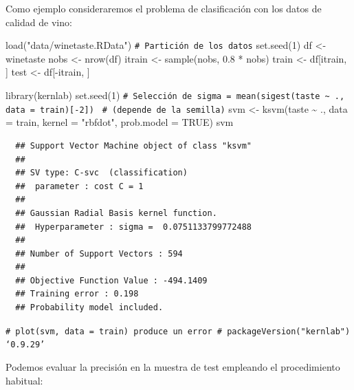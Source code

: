 \documentclass[
]{book}
\newenvironment{Shaded}{\begin{snugshade}}{\end{snugshade}}
\newcommand{\AttributeTok}[1]{\textcolor[rgb]{0.77,0.63,0.00}{#1}}
\newcommand{\CommentTok}[1]{\textcolor[rgb]{0.56,0.35,0.01}{\textit{#1}}}
\newcommand{\ConstantTok}[1]{\textcolor[rgb]{0.00,0.00,0.00}{#1}}
\newcommand{\DecValTok}[1]{\textcolor[rgb]{0.00,0.00,0.81}{#1}}
\newcommand{\FloatTok}[1]{\textcolor[rgb]{0.00,0.00,0.81}{#1}}
\newcommand{\FunctionTok}[1]{\textcolor[rgb]{0.00,0.00,0.00}{#1}}
\newcommand{\NormalTok}[1]{#1}
\newcommand{\OtherTok}[1]{\textcolor[rgb]{0.56,0.35,0.01}{#1}}
\newcommand{\SpecialCharTok}[1]{\textcolor[rgb]{0.00,0.00,0.00}{#1}}
\newcommand{\StringTok}[1]{\textcolor[rgb]{0.31,0.60,0.02}{#1}}
\theoremstyle{break}
\theoremstyle{nonumberplain}
\renewcommand{\CommentTok}[1]{\textcolor[rgb]{0.41,0.41,0.41}{\texttt{#1}}}
\begin{document}
Como ejemplo consideraremos el problema de clasificación con los datos de calidad de vino:

\begin{Shaded}
\begin{Highlighting}[]
\FunctionTok{load}\NormalTok{(}\StringTok{"data/winetaste.RData"}\NormalTok{)}
\CommentTok{\# Partición de los datos}
\FunctionTok{set.seed}\NormalTok{(}\DecValTok{1}\NormalTok{)}
\NormalTok{df }\OtherTok{\textless{}{-}}\NormalTok{ winetaste}
\NormalTok{nobs }\OtherTok{\textless{}{-}} \FunctionTok{nrow}\NormalTok{(df)}
\NormalTok{itrain }\OtherTok{\textless{}{-}} \FunctionTok{sample}\NormalTok{(nobs, }\FloatTok{0.8} \SpecialCharTok{*}\NormalTok{ nobs)}
\NormalTok{train }\OtherTok{\textless{}{-}}\NormalTok{ df[itrain, ]}
\NormalTok{test }\OtherTok{\textless{}{-}}\NormalTok{ df[}\SpecialCharTok{{-}}\NormalTok{itrain, ]}


\FunctionTok{library}\NormalTok{(kernlab)}
\FunctionTok{set.seed}\NormalTok{(}\DecValTok{1}\NormalTok{) }
\CommentTok{\# Selección de sigma = mean(sigest(taste \textasciitilde{} ., data = train)[{-}2]) }
\CommentTok{\# (depende de la semilla)}
\NormalTok{svm }\OtherTok{\textless{}{-}} \FunctionTok{ksvm}\NormalTok{(taste }\SpecialCharTok{\textasciitilde{}}\NormalTok{ ., }\AttributeTok{data =}\NormalTok{ train,}
            \AttributeTok{kernel =} \StringTok{"rbfdot"}\NormalTok{, }\AttributeTok{prob.model =} \ConstantTok{TRUE}\NormalTok{)}
\NormalTok{svm}
\end{Highlighting}
\end{Shaded}

\begin{verbatim}
  ## Support Vector Machine object of class "ksvm" 
  ## 
  ## SV type: C-svc  (classification) 
  ##  parameter : cost C = 1 
  ## 
  ## Gaussian Radial Basis kernel function. 
  ##  Hyperparameter : sigma =  0.0751133799772488 
  ## 
  ## Number of Support Vectors : 594 
  ## 
  ## Objective Function Value : -494.1409 
  ## Training error : 0.198 
  ## Probability model included.
\end{verbatim}

\begin{Shaded}
\begin{Highlighting}[]
\CommentTok{\# plot(svm, data = train) produce un error \# packageVersion("kernlab") ‘0.9.29’}
\end{Highlighting}
\end{Shaded}

Podemos evaluar la precisión en la muestra de test empleando el procedimiento habitual:
\end{document}
